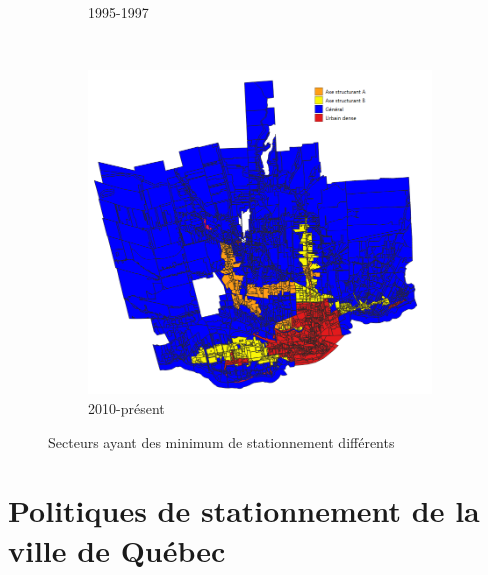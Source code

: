 \begin{figure}[ht]
\begin{subfigure}[t]{0.5\textwidth}
    \caption{1995-1997}
  \end{subfigure}\\
  \begin{subfigure}[t]{0.6\textwidth}
  \centering
  \includegraphics[width=0.8\linewidth]{images/geographie_code_urbanisme_2009_present.png}
  \caption{2010-présent}
  \end{subfigure}
  \caption{Secteurs ayant des minimum de stationnement différents}
  \label{fig:types_unites_voisinage}
\end{figure}
\FloatBarrier
\section{Politiques de stationnement de la ville de Québec} \label{sec:politiques_stationnement}

